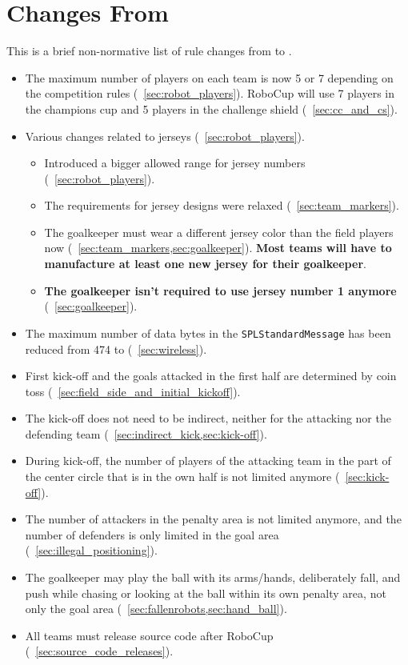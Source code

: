 \section{Changes From \LastRCYear}
This is a brief non-normative list of rule changes from \LastRCYear to \RCYear.

\begin{itemize}
  \item The maximum number of players on each team is now 5 or 7 depending on the competition rules (\cf~\cref{sec:robot_players}). RoboCup \RCYear will use 7 players in the champions cup and 5 players in the challenge shield (\cf~\cref{sec:cc_and_cs}).
  \item Various changes related to jerseys (\cf~\cref{sec:robot_players}).
  \begin{itemize}
    \item Introduced a bigger allowed range for jersey numbers (\cf~\cref{sec:robot_players}).
    \item The requirements for jersey designs were relaxed (\cf~\cref{sec:team_markers}).
    \item The goalkeeper must wear a different jersey color than the field players now (\cf~\cref{sec:team_markers,sec:goalkeeper}). \textbf{Most teams will have to manufacture at least one new jersey for their goalkeeper}.
    \item \textbf{The goalkeeper isn't required to use jersey number 1 anymore} (\cf~\cref{sec:goalkeeper}).
  \end{itemize}
  \item The maximum number of data bytes in the \texttt{SPLStandardMessage} has been reduced from 474 to \TeamMessageDataSize{} (\cf~\cref{sec:wireless}).
  \item First kick-off and the goals attacked in the first half are determined by coin toss (\cf~\cref{sec:field_side_and_initial_kickoff}).
  \item The kick-off does not need to be indirect, neither for the attacking nor the defending team (\cf~\cref{sec:indirect_kick,sec:kick-off}).
  \item During kick-off, the number of players of the attacking team in the part of the center circle that is in the own half is not limited anymore (\cf~\cref{sec:kick-off}).
  \item The number of attackers in the penalty area is not limited anymore, and the number of defenders is only limited in the goal area (\cf~\cref{sec:illegal_positioning}).
  \item The goalkeeper may play the ball with its arms/hands, deliberately fall, and push while chasing or looking at the ball within its own penalty area, not only the goal area (\cf~\cref{sec:fallenrobots,sec:hand_ball}).
  \item All teams must release source code after RoboCup (\cf~\cref{sec:source_code_releases}).
\end{itemize}
